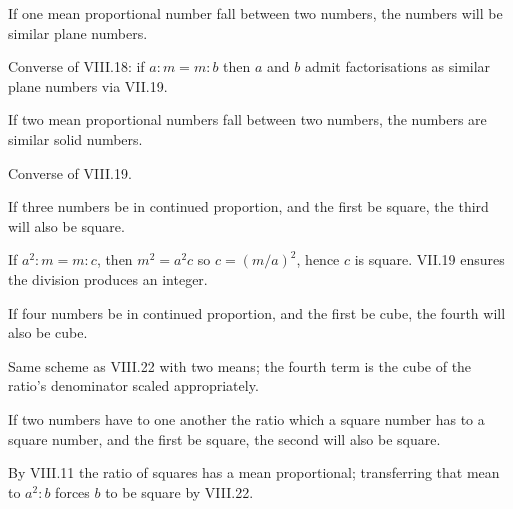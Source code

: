 \begin{claim}
\label{prop:VIII.20}
If one mean proportional number fall between two numbers, the numbers
will be similar plane numbers.
\end{claim}
\begin{evidence}
\label{ev:VIII.20}
Converse of VIII.18: if $a : m = m : b$ then $a$ and $b$ admit
factorisations as similar plane numbers via VII.19.
\end{evidence}

\begin{claim}
\label{prop:VIII.21}
If two mean proportional numbers fall between two numbers, the
numbers are similar solid numbers.
\end{claim}
\begin{evidence}
\label{ev:VIII.21}
Converse of VIII.19.
\end{evidence}

\begin{claim}
\label{prop:VIII.22}
If three numbers be in continued proportion, and the first be square,
the third will also be square.
\end{claim}
\begin{evidence}
\label{ev:VIII.22}
If $a^2 : m = m : c$, then $m^2 = a^2 c$ so $c = (m/a)^2$, hence $c$
is square.  VII.19 ensures the division produces an integer.
\end{evidence}

\begin{claim}
\label{prop:VIII.23}
If four numbers be in continued proportion, and the first be cube,
the fourth will also be cube.
\end{claim}
\begin{evidence}
\label{ev:VIII.23}
Same scheme as VIII.22 with two means; the fourth term is the cube
of the ratio's denominator scaled appropriately.
\end{evidence}

\begin{claim}
\label{prop:VIII.24}
If two numbers have to one another the ratio which a square number
has to a square number, and the first be square, the second will
also be square.
\end{claim}
\begin{evidence}
\label{ev:VIII.24}
By VIII.11 the ratio of squares has a mean proportional; transferring
that mean to $a^2 : b$ forces $b$ to be square by VIII.22.
\end{evidence}


